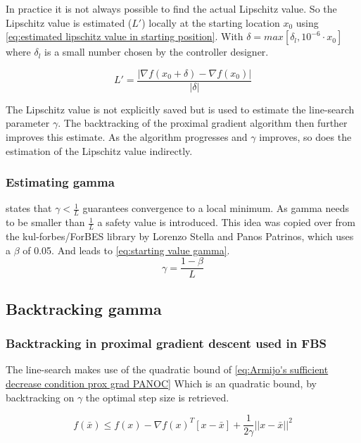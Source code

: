 			In practice it is not always possible to find the actual Lipschitz value. So the Lipschitz value is estimated ($L'$) locally at the starting location $x_0$ using \eqref{eq:estimated lipschitz value in starting position}. With $\delta=max[\delta_l,10^{-6} \cdot x_0]$ where $\delta_l$ is a small number chosen by the controller designer.
			
			\begin{equation}
			L' = \frac{|\nabla f(x_0+\delta)-\nabla f(x_0)|}{|\delta|}
			\label{eq:estimated lipschitz value in starting position}
			\end{equation}
			
			The Lipschitz value is not explicitly saved but is used to estimate the line-search parameter $\gamma$. The backtracking of the proximal gradient algorithm then further improves this estimate. As the algorithm progresses and $\gamma$ improves, so does the estimation of the Lipschitz value indirectly.
		
		\subsubsection{Estimating gamma}	
			\cite{LorenzoStella2017} states that $\gamma<\frac{1}{L}$ guarantees convergence to a local minimum. As gamma needs to be smaller than $\frac{1}{L}$ a safety value is introduced. This idea was copied over from the kul-forbes/ForBES library by Lorenzo Stella and Panos Patrinos, which uses a $\beta$ of 0.05. And leads to \eqref{eq:starting value gamma}.
			\begin{equation}
			\gamma = \frac{1-\beta}{L}
			\label{eq:starting value gamma}
			\end{equation}		
	
	\subsection{Backtracking gamma}			
		\subsubsection{Backtracking in proximal gradient descent used in FBS}
			The line-search makes use of the quadratic bound of \eqref{eq:Armijo's sufficient decrease condition prox grad PANOC} Which is an quadratic bound, by backtracking on $\gamma$ the optimal step size is retrieved.
			
			\begin{equation}
			f({\bar{x}}) \leq f(x) - \nabla f(x)^T[x-\bar{x}] + \frac{1}{2 \gamma}||x-\bar{x}||^2
			\label{eq:Armijo's sufficient decrease condition prox grad PANOC}
			\end{equation}
			
